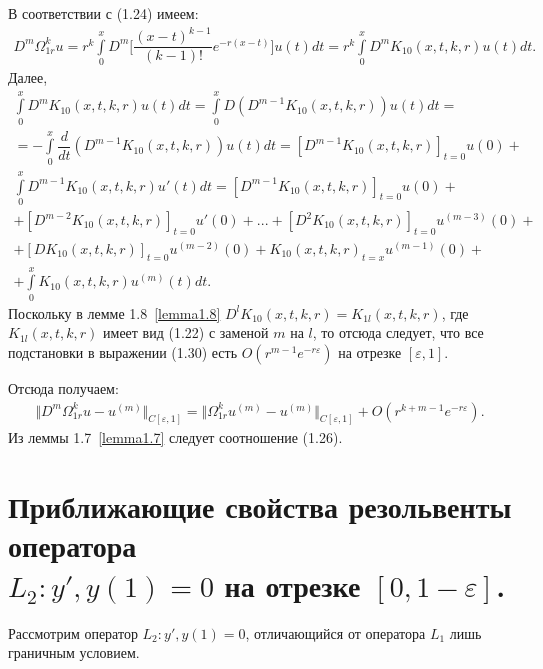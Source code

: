 В соответствии с (1.24) имеем:
\begin{equation}
\begin{array}{c}
\nonumber

D^m\Omega_{1r}^ku = r^k\int\limits_0^x D^m \biggl[ \dfrac{(x-t)^{k-1}}{(k-1)!}e^{-r(x-t)} \biggr]u(t)dt = r^k\int\limits_0^x D^mK_{10}(x,t,k,r)u(t)dt.

\end{array}
\end{equation}
Далее,
\begin{equation}
\begin{array}{c}

\int\limits_0^x D^mK_{10}(x,t,k,r)u(t)dt = \int\limits_0^x D(D^{m-1}K_{10}(x,t,k,r))u(t)dt = \\ 
= - \int\limits_0^x \dfrac{d}{dt}(D^{m-1}K_{10}(x,t,k,r))u(t)dt = [D^{m-1}K_{10}(x,t,k,r)]_{t=0}u(0) + \\ \int\limits_0^x D^{m-1}K_{10}(x,t,k,r)u'(t)dt = [D^{m-1}K_{10}(x,t,k,r)]_{t=0}u(0) + \\ + [D^{m-2}K_{10}(x,t,k,r)]_{t=0}u'(0) + ... + [D^2K_{10}(x,t,k,r)]_{t=0}u^{(m-3)}(0) + \\ + [DK_{10}(x,t,k,r)]_{t=0}u^{(m-2)}(0) + K_{10}(x,t,k,r)_{t=x}u^{(m-1)}(0) + \\ + \int\limits_0^x K_{10}(x,t,k,r)u^{(m)}(t)dt.

\end{array}
\end{equation}
Поскольку в лемме 1.8~\eqref{lemma1.8} $ D^lK_{10}(x,t,k,r) = K_{1l}(x,t,k,r) $, где $ K_{1l}(x,t,k,r) $ имеет вид (1.22) с заменой $ m $ на $ l $, то отсюда следует, что все подстановки в выражении (1.30) есть $ O(r^{m-1}e^{-r\varepsilon}) $ на отрезке $ [\varepsilon ,1] $.

Отсюда получаем:
\begin{equation}
\begin{array}{c}
\nonumber

\Vert D^m\Omega_{1r}^ku - u^{(m)} \Vert_{C[\varepsilon ,1]} = \Vert \Omega_{1r}^ku^{(m)} - u^{(m)} \Vert_{C[\varepsilon ,1]} + O(r^{k+m-1}e^{-r\varepsilon}).

\end{array}
\end{equation}
Из леммы 1.7~\eqref{lemma1.7} следует соотношение (1.26).

\chapter{Приближающие свойства резольвенты оператора \\ $ L_2:y', y(1)=0 $ на отрезке $ [0, 1 - \varepsilon] $.}
Рассмотрим оператор $ L_2: y', y(1) = 0 $, отличающийся от оператора $ L_1 $ лишь граничным условием.

